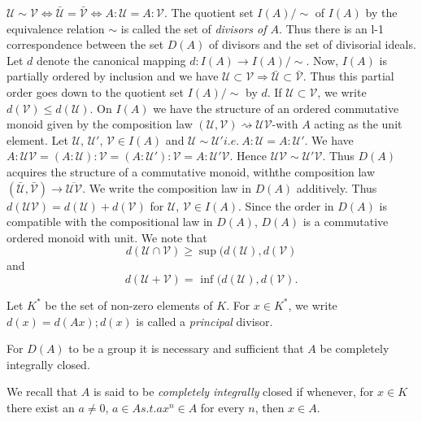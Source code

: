 \noindent
$\mathscr{U} \sim \mathscr{V} \Leftrightarrow \bar{\mathscr{U}} =
\bar{\mathscr{V}} \Leftrightarrow A : \mathscr{U} = A:
\mathscr{V}$. The quotient set $I(A)/\sim$ of $I(A)$ by the equivalence
relation $\sim$ is called the set of \textit{divisors of $A$}. Thus
there is an l-1 correspondence between the set $D(A)$ of divisors and
the set of divisorial ideals. Let $d$ denote the canonical mapping $d:
I (A) \rightarrow I(A) / \sim$. Now, $I(A)$ is partially ordered by
inclusion and we have $\mathscr{U} \subset \mathscr{V} \Rightarrow
\bar{\mathscr{U}} \subset \bar{\mathscr{V}}$. Thus this partial order
goes down to the 
quotient set $I(A) / \sim$ by $d$. If $\mathscr{U} \subset
\mathscr{V}$, we write $d (\mathscr{V}) \leq d(\mathscr{U})$. 
On $I(A)$ we have the structure of an ordered commutative monoid given
by the composition law $(\mathscr{U}, \mathscr{V}) \rightsquigarrow
\mathscr{U} \mathscr{V}$-with $A$ acting as the unit element. Let
$\mathscr{U}$, $\mathscr{U}'$, $\mathscr{V} \in I(A)$ and $\mathscr{U}
\sim \mathscr{U}' i.e. ~ A : \mathscr{U} = A : \mathscr{U}'$. We have
$A : \mathscr{U} \mathscr{V} = (A : \mathscr{U}) : \mathscr{V} = (A :
\mathscr{U}') : \mathscr{V} = A : \mathscr{U}' \mathscr{V}$. Hence
$\mathscr{U} \mathscr{V} \sim \mathscr{U}' \mathscr{V}$. Thus $D(A)$
acquires the structure of a commutative monoid, with\pageoriginale the
composition 
law $(\bar{\mathscr{U}}, \bar{\mathscr{V}}) \rightarrow
\overline{\mathscr{U} \mathscr{V}}$. We write the composition law in
$D(A)$ additively. Thus $d(\mathscr{U} \mathscr{V}) = d(\mathscr{U}) +
d (\mathscr{V})$ for $\mathscr{U}$, $\mathscr{V} \in I(A)$. Since the
order in $D(A)$ is compatible with the compositional law in $D(A)$, $D(A)$
is a commutative ordered monoid with unit. We note that
$$
d(\mathscr{U} \cap \mathscr{V}) \geq \sup (d (\mathscr{U}), d
(\mathscr{V})   
$$
and  
$$
d(\mathscr{U}+ \mathscr{V}) = \text{ inf } (d (\mathscr{U}), d
(\mathscr{V}). 
$$

\noindent
Let $K^*$ be the set of non-zero elements of $K$. For $x \in K^*$, we
write $d(x) = d(Ax); d(x)$ is called a \textit{principal} divisor. 

\begin{theorem}\label{chap1:thm2.1} %
For $D(A)$ to be a group it is necessary and sufficient that $A$
  be completely integrally closed. 
 \end{theorem} 
 
 We recall that $A$ is said to be \textit{completely integrally}
 closed if whenever, for $x \in K$ there exist an $a \neq 0$, $a \in A
 s.t. ax^n \in A$ for every $n$, then $x \in A$. 
 
